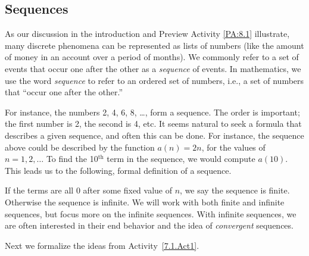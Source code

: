 
\subsection*{Sequences} 

As our discussion in the introduction and Preview Activity \ref{PA:8.1} illustrate, many discrete phenomena can be represented as lists of numbers (like the amount of money in an account over a period of months). We commonly refer to a set of events that occur one after the other as a \textit{sequence} of events. In mathematics, we use the word \textit{sequence} to refer to an ordered set of numbers, i.e., a set of numbers that ``occur one after the other.''

For instance, the numbers 2, 4, 6, 8, \ldots, form a sequence. The order is important; the first number is 2, the second is 4, etc. It seems natural to seek a formula that describes a given sequence, and often this can be done. For instance, the sequence above could be described by the function $a(n) = 2n$, for the values of $n = 1, 2, \ldots$ To find the 10$^\text{th}$ term in the sequence, we would compute $a(10)$. This leads us to the following, formal definition of a sequence.


If the terms are all 0 after some fixed value of $n$, we say the sequence is finite. Otherwise the sequence is infinite. We will work with both finite and infinite sequences, but focus more on the infinite sequences. With infinite sequences, we are often interested in their end behavior and the idea of \emph{convergent} sequences.


Next we formalize the ideas from Activity~\ref{7.1.Act1}.

